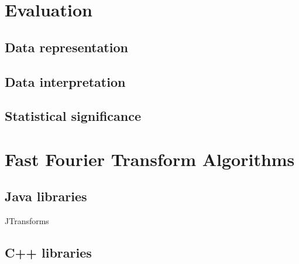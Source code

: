 \section{Evaluation}

\subsection{Data representation}
\subsection{Data interpretation}
\subsection{Statistical significance}

\section{Fast Fourier Transform Algorithms}

\subsection{Java libraries}
JTransforms\cite{jtransforms:benchmark}

\subsection{C++ libraries}
\cite{FFTW05}

